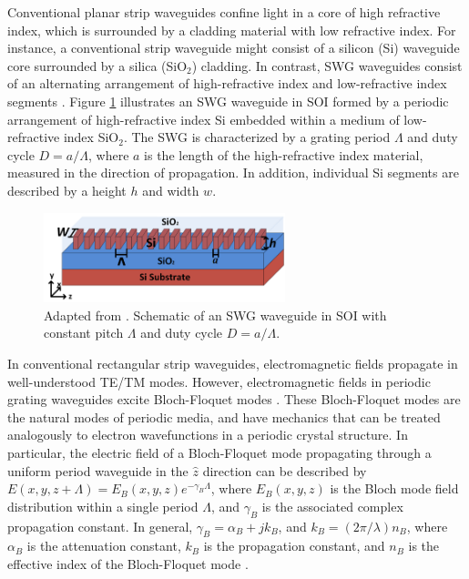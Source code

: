 \documentclass[aps,prl,twocolumn, superscriptaddress]{revtex4}
\begin{document}
Conventional planar strip waveguides confine light in a core of high refractive index, which is surrounded by a cladding material with low refractive index. For instance, a conventional strip waveguide might consist of a silicon (Si) waveguide core surrounded by a silica (SiO$_2$) cladding. In contrast, SWG waveguides consist of an alternating arrangement of high-refractive index and low-refractive index segments \cite{OGswg}. Figure \ref{fig:SWGdiagram} illustrates an SWG waveguide in SOI formed by a periodic arrangement of high-refractive index Si embedded within a medium of low-refractive index SiO$_2$. The SWG is characterized by a grating period $\Lambda$ and duty cycle $D= a/\Lambda$, where $a$ is the length of the high-refractive index material, measured in the direction of propagation. In addition, individual Si segments are described by a height $h$ and width $w$. 

\begin{figure}[!h]
    \centering
    \includegraphics[width=7cm]{SWGwaveguide.png}
    \caption{Adapted from \cite{ChenPaper}. Schematic of an SWG waveguide in SOI with constant pitch $\Lambda$ and duty cycle $D = a/\Lambda$. }
    \label{fig:SWGdiagram}
\end{figure}

In conventional rectangular strip waveguides, electromagnetic fields propagate in well-understood TE/TM modes. However, electromagnetic fields in periodic grating waveguides excite Bloch-Floquet modes \cite{PhotonicCrystalsText}. These Bloch-Floquet modes are the natural modes of periodic media, and have mechanics that can be treated analogously to electron wavefunctions in a periodic crystal structure. In particular, the electric field of 
a Bloch-Floquet mode propagating through a uniform period waveguide in the $\hat{z}$ direction can be described by $E(x,y,z+\Lambda) = E_B(x,y,z)e^{-\gamma_B\Lambda}$, where $E_B(x,y,z)$ is the Bloch mode field distribution within a single period $\Lambda$, and $\gamma_B$ is the associated complex propagation constant. In general, $\gamma_B = \alpha_B + jk_B$, and $k_B = (2\pi/\lambda)n_B$, where $\alpha_B$ is the attenuation constant, $k_B$ is the propagation constant, and $n_B$ is the effective index of the Bloch-Floquet mode \cite{HalirReview}. 
\end{document}

